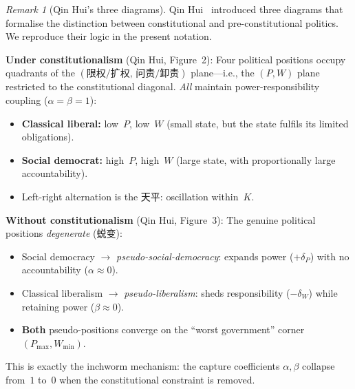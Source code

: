 \documentclass[11pt,a4paper]{article}
\theoremstyle{definition}
\theoremstyle{remark}
\newtheorem{remark}[theorem]{Remark}
\begin{document}
\begin{remark}[Qin Hui's three diagrams]
\label{rmk:qinhui-diagrams}
Qin Hui~\cite{qinhui2003} introduced three diagrams that formalise the
distinction between constitutional and pre-constitutional politics.
We reproduce their logic in the present notation.

\medskip\noindent\textbf{Under constitutionalism} (Qin Hui, Figure~2):
Four political positions occupy quadrants of the
$(\text{限权/扩权},\, \text{问责/卸责})$ plane---i.e., the
$(P,W)$ plane restricted to the constitutional diagonal.
\emph{All} maintain power-responsibility coupling ($\alpha = \beta = 1$):
\begin{itemize}[nosep]
\item \textbf{Classical liberal:} low~$P$, low~$W$ (small state,
  but the state fulfils its limited obligations).
\item \textbf{Social democrat:} high~$P$, high~$W$ (large state,
  with proportionally large accountability).
\item Left-right alternation is the 天平: oscillation within~$K$.
\end{itemize}

\medskip\noindent\textbf{Without constitutionalism} (Qin Hui, Figure~3):
The genuine political positions \emph{degenerate} (蜕变):
\begin{itemize}[nosep]
\item Social democracy $\to$ \emph{pseudo-social-democracy}: expands
  power ($+\delta_P$) with no accountability ($\alpha \approx 0$).
\item Classical liberalism $\to$ \emph{pseudo-liberalism}: sheds
  responsibility ($-\delta_W$) while retaining power
  ($\beta \approx 0$).
\item \textbf{Both} pseudo-positions converge on the ``worst
  government'' corner $(P_{\max}, W_{\min})$.
\end{itemize}
This is exactly the inchworm mechanism: the capture coefficients
$\alpha, \beta$ collapse from~$1$ to~$0$ when the constitutional
constraint is removed.
\end{remark}
\end{document}
